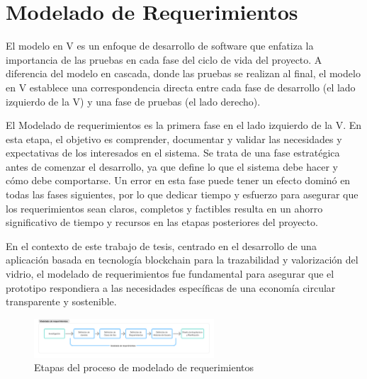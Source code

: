 \chapter[Modelado de Requerimientos]{Modelado de Requerimientos}
\label{cp:modelling}

\parindent0pt

El modelo en V es un enfoque de desarrollo de software que enfatiza la importancia de las pruebas en cada fase del ciclo de vida del proyecto. A diferencia del modelo en cascada, donde las pruebas se realizan al final, el modelo en V establece una correspondencia directa entre cada fase de desarrollo (el lado izquierdo de la V) y una fase de pruebas (el lado derecho).

El Modelado de requerimientos es la primera fase en el lado izquierdo de la V. En esta etapa, el objetivo es comprender, documentar y validar las necesidades y expectativas de los interesados en el sistema. Se trata de una fase estratégica antes de comenzar el desarrollo, ya que define lo que el sistema debe hacer y cómo debe comportarse. Un error en esta fase puede tener un efecto dominó en todas las fases siguientes, por lo que dedicar tiempo y esfuerzo para asegurar que los requerimientos sean claros, completos y factibles resulta en un ahorro significativo de tiempo y recursos en las etapas posteriores del proyecto. 

En el contexto de este trabajo de tesis, centrado en el desarrollo de una aplicación basada en tecnología blockchain para la trazabilidad y valorización del vidrio, el modelado de requerimientos fue fundamental para asegurar que el prototipo respondiera a las necesidades específicas de una economía circular transparente y sostenible.

\begin{figure}[!htpb]
    \centering
    \includegraphics[width=0.6\textwidth]{Figures/requirements-modelling.png}
    \caption{Etapas del proceso de modelado de requerimientos}
    \label{fig:requirements-modelling-process}
\end{figure}


